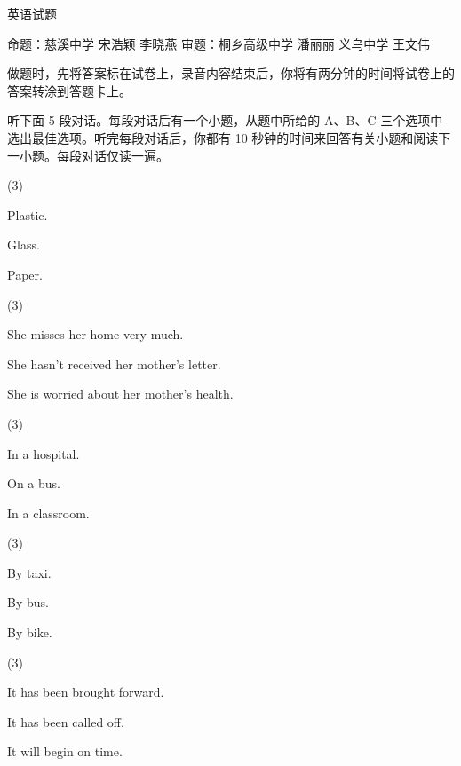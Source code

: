 \documentclass{英语试卷}
\begin{document}
\par 英语试题\par
\par 命题：慈溪中学 宋浩颖 李晓燕 审题：桐乡高级中学 潘丽丽 义乌中学 王文伟\par
{}
\par 做题时，先将答案标在试卷上，录音内容结束后，你将有两分钟的时间将试卷上的答案转涂到答题卡上。\par
{}
\par 听下面 5 段对话。每段对话后有一个小题，从题中所给的 A、B、C 三个选项中选出最佳选项。听完每段对话后，你都有 10 秒钟的时间来回答有关小题和阅读下一小题。每段对话仅读一遍。\par
{}
\begin{choices}(3)
  \item Plastic.
  \item Glass.
  \item Paper.
\end{choices}
\begin{choices}(3)
  \item She misses her home very much.
  \item She hasn't received her mother's letter.
  \item She is worried about her mother's health.
\end{choices}
\begin{choices}(3)
  \item In a hospital.
  \item On a bus.
  \item In a classroom.
\end{choices}
\begin{choices}(3)
  \item By taxi.
  \item By bus.
  \item By bike.
\end{choices}
\begin{choices}(3)
  \item It has been brought forward.
  \item It has been called off.
  \item It will begin on time.
\end{choices}
\end{document}
